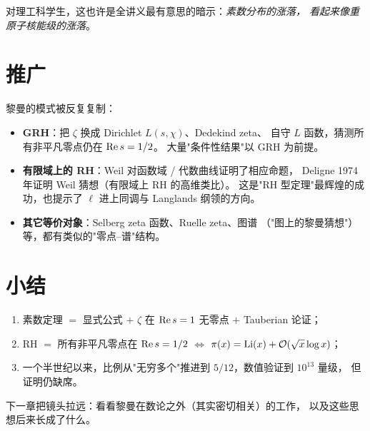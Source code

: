 对理工科学生，这也许是全讲义最有意思的暗示：\emph{素数分布的涨落，
看起来像重原子核能级的涨落}。

\section{推广}
\label{sec:04-generalisations}

黎曼的模式被反复复制：
\begin{itemize}
  \item \textbf{GRH}：把 $\zeta$ 换成 Dirichlet $L(s,\chi)$、Dedekind zeta、
        自守 $L$ 函数，猜测所有非平凡零点仍在 $\operatorname{Re} s=1/2$。
        大量"条件性结果"以 GRH 为前提。
  \item \textbf{有限域上的 RH}：Weil 对函数域 / 代数曲线证明了相应命题，
        Deligne 1974 年证明 Weil 猜想（有限域上 RH 的高维类比）\cite{deligne1974}。
        这是"RH 型定理"最辉煌的成功，也提示了 $\ell$ 进上同调与
        Langlands 纲领的方向。
  \item \textbf{其它等价对象}：Selberg zeta 函数、Ruelle zeta、图谱
        （"图上的黎曼猜想"）等，都有类似的"零点--谱"结构。
\end{itemize}

\section{小结}
\label{sec:04-summary}

\begin{enumerate}[label=\arabic*.]
  \item 素数定理 $= $ 显式公式 $+$ $\zeta$ 在 $\operatorname{Re} s=1$ 无零点 $+$ Tauberian 论证；
  \item RH $=$ 所有非平凡零点在 $\operatorname{Re} s=1/2$ $\iff$ $\pi(x)=\operatorname{Li}(x)+\mathcal{O}(\sqrt{x}\log x)$；
  \item 一个半世纪以来，比例从"无穷多个"推进到 $5/12$，数值验证到 $10^{13}$ 量级，
        但证明仍缺席。
\end{enumerate}

下一章把镜头拉远：看看黎曼在数论之外（其实密切相关）的工作，
以及这些思想后来长成了什么。
